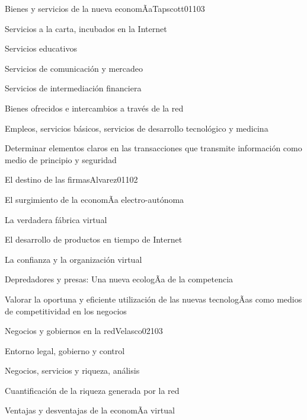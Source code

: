 \begin{syllabus}
\begin{unit}{Bienes y servicios de la nueva economÃ­a}{Tapscott01}{10}{3}
   \begin{topics}
      \item Servicios a la carta, incubados en la Internet
	\item Servicios educativos
	\item Servicios de comunicación y mercadeo
	\item Servicios de intermediación financiera
	\item Bienes ofrecidos e intercambios a través de la red
	\item Empleos, servicios básicos, servicios de desarrollo tecnológico y medicina
   \end{topics}

   \begin{unitgoals}
      \item Determinar elementos claros en las transacciones que transmite información como medio de principio y seguridad
   \end{unitgoals}
\end{unit}

\begin{unit}{El destino de las firmas}{Alvarez01}{10}{2}
   \begin{topics}
      \item El surgimiento de la economÃ­a electro-autónoma
	\item La verdadera fábrica virtual
	\item El desarrollo de productos en tiempo de Internet
	\item La confianza y la organización virtual
	\item Depredadores y presas: Una nueva ecologÃ­a de la competencia
   \end{topics}

   \begin{unitgoals}
      \item Valorar la oportuna y eficiente utilización de las nuevas tecnologÃ­as como medios de competitividad en los negocios
   \end{unitgoals}
\end{unit}

\begin{unit}{Negocios y gobiernos en la red}{Velasco02}{10}{3}
   \begin{topics}
      \item Entorno legal, gobierno y control
	\item Negocios, servicios y riqueza, análisis
	\item Cuantificación de la riqueza generada por la red
	\item Ventajas y desventajas de la economÃ­a virtual
   \end{topics}


\end{unit}
\end{syllabus}
